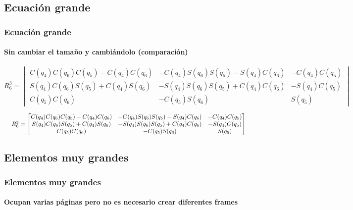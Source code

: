 	\begin{frame}   
		\section{Ecuación grande}
		\frametitle{Ecuación grande}
		\framesubtitle{Sin cambiar el tamaño y cambiándolo (comparación)}
		
		\begin{equation} 
			R_6^3 =
			\begin{vmatrix}
				C(q_4)C(q_6)C(q_5)-C(q_4)C(q_6) & -C(q_4)S(q_6)S(q_5)-S(q_4)C(q_6) & -C(q_4)C(q_5) \\
				S(q_4)C(q_6)S(q_5)+C(q_4)S(q_6) & -S(q_4)S(q_6)S(q_5)+C(q_4)C(q_6) & -S(q_4)C(q_5) \\
				C(q_5)C(q_6)                    & -C(q_5)S(q_6)                    & S(q_5)
			\end{vmatrix}
		\end{equation}
	
		\begin{equation*} 
			\resizebox{\textwidth}{!}{
				$	%
				R_6^3 =
				\begin{bmatrix}
					C(q_4)C(q_6)C(q_5)-C(q_4)C(q_6) & -C(q_4)S(q_6)S(q_5)-S(q_4)C(q_6) & -C(q_4)C(q_5) \\
					S(q_4)C(q_6)S(q_5)+C(q_4)S(q_6) & -S(q_4)S(q_6)S(q_5)+C(q_4)C(q_6) & -S(q_4)C(q_5) \\
					C(q_5)C(q_6)                    & -C(q_5)S(q_6)                    & S(q_5)
				\end{bmatrix}
			$
			}
		\end{equation*}

	\end{frame}
	\begin{frame}[t,allowframebreaks]
		\section{Elementos muy grandes}
		\frametitle{Elementos muy grandes}
		\framesubtitle{Ocupan varias páginas pero no es necesario crear diferentes frames}
		\lipsum[6-9]
	\end{frame}


